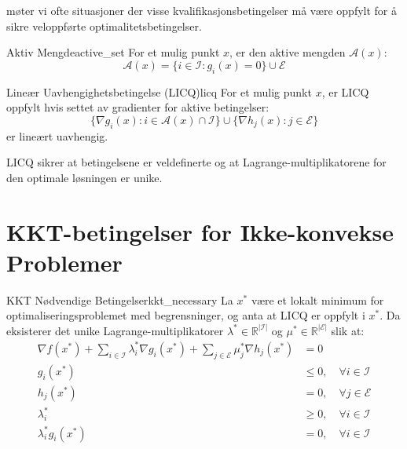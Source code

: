 møter vi ofte situasjoner der visse kvalifikasjonsbetingelser må være oppfylt for å sikre veloppførte optimalitetsbetingelser.

\begin{definition}{Aktiv Mengde}{active_set}
    For et mulig punkt \( x \), er den aktive mengden \( \mathcal{A}(x) \):
    \[
        \mathcal{A}(x) = \{i \in \mathcal{I} : g_i(x) = 0\} \cup \mathcal{E}
    \]
\end{definition}

\begin{definition}{Lineær Uavhengighetsbetingelse (LICQ)}{licq}
    For et mulig punkt \( x \), er LICQ oppfylt hvis settet av gradienter for aktive betingelser:
    \[
        \{\nabla g_i(x) : i \in \mathcal{A}(x) \cap \mathcal{I}\} \cup \{\nabla h_j(x) : j \in \mathcal{E}\}
    \]
    er lineært uavhengig.
\end{definition}

LICQ sikrer at betingelsene er veldefinerte og at Lagrange-multiplikatorene for den optimale løsningen er unike.

\section{KKT-betingelser for Ikke-konvekse Problemer}

\begin{theorem}{KKT Nødvendige Betingelser}{kkt_necessary}
    La \( x^* \) være et lokalt minimum for optimaliseringsproblemet med begrensninger, og anta at LICQ er oppfylt i \( x^* \). Da eksisterer det unike Lagrange-multiplikatorer \( \lambda^* \in \mathbb{R}^{|\mathcal{I}|} \) og \( \mu^* \in \mathbb{R}^{|\mathcal{E}|} \) slik at:
    \begin{align}
        \nabla f(x^*) + \sum_{i \in \mathcal{I}} \lambda_i^* \nabla g_i(x^*) + \sum_{j \in \mathcal{E}} \mu_j^* \nabla h_j(x^*) & = 0 \tag{Stasjonaritet}                                           \\
        g_i(x^*)                                                                                                                & \leq 0, \quad \forall i \in \mathcal{I} \tag{Primal Feasibilitet} \\
        h_j(x^*)                                                                                                                & = 0, \quad \forall j \in \mathcal{E} \tag{Primal Feasibilitet}    \\
        \lambda_i^*                                                                                                             & \geq 0, \quad \forall i \in \mathcal{I} \tag{Dual Feasibilitet}   \\
        \lambda_i^* g_i(x^*)                                                                                                    & = 0, \quad \forall i \in \mathcal{I} \tag{Komplementær Slakkhet}
    \end{align}
\end{theorem}

